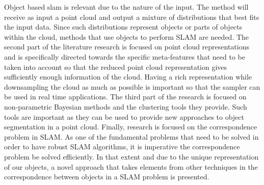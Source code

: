 \documentclass[twoside,hidelinks]{article}
\begin{document}
Object based slam is relevant due to the nature of the input. The method will receive as input a point cloud and output a mixture of distributions that best fits the input data. Since such distributions represent objects or parts of objects within the cloud, methods that use objects to perform SLAM are needed. The second part of the literature research is focused on point cloud representations and is specifically directed towards the specific meta-features that need to be taken into account so that the reduced point cloud representation gives sufficiently enough information of the cloud. Having a rich representation while downsampling the cloud as much as possible is important so that the sampler can be used in real time applications. The third part of the research is focused on non-parametric Bayesian methods and the clustering tools they provide. Such tools are important as they can be used to provide new approaches to object segmentation in a point cloud. Finally, research is focused on the correspondence problem in SLAM. As one of the fundamental problems that need to be solved in order to have robust SLAM algorithms, it is imperative the correspondence problem be solved efficiently. In that extent and due to the unique representation of our objects, a novel approach that takes elements from other techniques in the correspondence between objects in a SLAM problem is presented.
\end{document}
